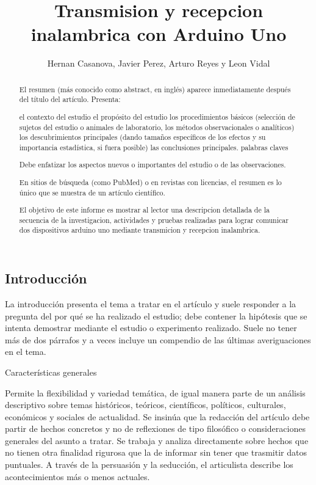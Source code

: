 \documentclass[10pt,letterpaper]{article}
\author{Hernan Casanova, Javier Perez, Arturo Reyes y Leon Vidal}
\title{Transmision y recepcion inalambrica con Arduino Uno}
\date{}
\begin{document}
\maketitle
\thispagestyle{empty}
\begin{multicols}{2}
\begin{abstract} 
El resumen (más conocido como abstract, en inglés) aparece inmediatamente después del título del artículo. Presenta:

    el contexto del estudio
    el propósito del estudio
    los procedimientos básicos (selección de sujetos del estudio o animales de laboratorio, los métodos observacionales o analíticos)
    los descubrimientos principales (dando tamaños específicos de los efectos y su importancia estadística, si fuera posible)
    las conclusiones principales.
    palabras claves

Debe enfatizar los aspectos nuevos o importantes del estudio o de las observaciones.

En sitios de búsqueda (como PubMed) o en revistas con licencias, el resumen es lo único que se muestra de un artículo científico.


El objetivo de este informe es mostrar al lector una descripcion detallada de la secuencia de la investigacion, actividades y pruebas realizadas para lograr comunicar dos dispositivos arduino uno mediante transmicion y recepcion inalambrica.


\end{abstract}

\section{Introducción}
La introducción presenta el tema a tratar en el artículo y suele responder a la pregunta del por qué se ha realizado el estudio; debe contener la hipótesis que se intenta demostrar mediante el estudio o experimento realizado. Suele no tener más de dos párrafos y a veces incluye un compendio de las últimas averiguaciones en el tema.

Características generales

    Permite la flexibilidad y variedad temática, de igual manera parte de un análisis descriptivo sobre temas históricos, teóricos, científicos, políticos, culturales, económicos y sociales de actualidad.
    Se insinúa que la redacción del artículo debe partir de hechos concretos y no de reflexiones de tipo filosófico o consideraciones generales del asunto a tratar.
    Se trabaja y analiza directamente sobre hechos que no tienen otra finalidad rigurosa que la de informar sin tener que trasmitir datos puntuales. A través de la persuasión y la seducción, el articulista describe los acontecimientos más o menos actuales.
    

\end{multicols}
\end{document}
